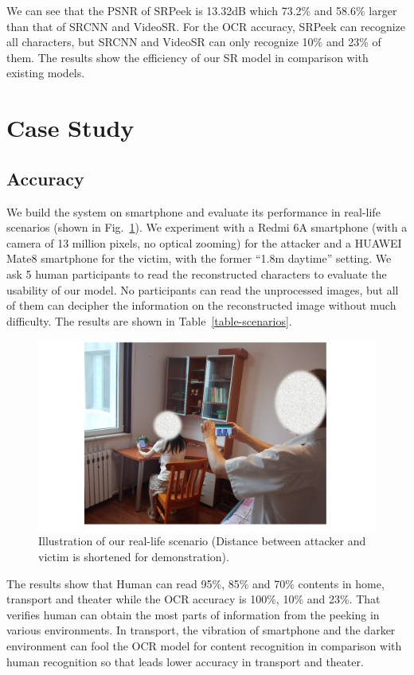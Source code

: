We can see that the PSNR of SRPeek is 13.32dB which 73.2\% and 58.6\% larger than that of SRCNN and VideoSR. For the OCR accuracy, SRPeek can recognize all characters, but SRCNN and VideoSR can only recognize 10\% and 23\% of them. The results show the efficiency of our SR model in comparison with existing models.

\section{Case Study}
\label{case-study}
\subsection{Accuracy}

We build the system on smartphone and evaluate its performance in real-life scenarios (shown in Fig.~\ref{fig-reallife}). We experiment with a Redmi 6A smartphone (with a camera of 13 million pixels, no optical zooming) for the attacker and a HUAWEI Mate8 smartphone for the victim, with the former ``1.8m daytime'' setting. We ask 5 human participants to read the reconstructed characters to evaluate the usability of our model. No participants can read the unprocessed images, but all of them can decipher the information on the reconstructed image without much difficulty. The results are shown in Table~\ref{table-scenarios}.
\begin{figure}
	\centering
	\includegraphics[width=0.80\linewidth]{pic/reallife.pdf}
    \caption{Illustration of our real-life scenario (Distance between attacker and victim is shortened for demonstration).}
	\label{fig-reallife}
\end{figure}

The results show that Human can read 95\%, 85\% and 70\% contents in home, transport and theater while the OCR accuracy is 100\%, 10\% and 23\%. That verifies human can obtain the most parts of information from the peeking in various environments. In transport, the vibration of smartphone and the darker environment can fool the OCR model for content recognition in comparison with human recognition so that leads lower accuracy in transport and theater.

